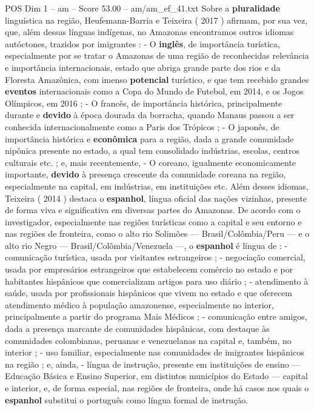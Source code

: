 \begin{textsample}{POS Dim 1 – am – Score 53.00 – am/am\_ef\_41.txt}
Sobre a \textbf{pluralidade} linguística na região, Heufemann-Barria e Teixeira ( 2017 ) afirmam, por sua vez, que, além dessas línguas indígenas, no Amazonas encontramos outros idiomas autóctones, trazidos por imigrantes : - O \textbf{inglês}, de importância turística, especialmente por se tratar o Amazonas de uma região de reconhecidas relevância e importância internacionais, estado que abriga grande parte dos rios e da Floresta Amazônica, com imenso \textbf{potencial} turístico, e que tem recebido grandes \textbf{eventos} internacionais como a Copa do Mundo de Futebol, em 2014, e os Jogos Olímpicos, em 2016 ; - O francês, de importância histórica, principalmente durante e \textbf{devido} à época dourada da borracha, quando Manaus passou a ser conhecida internacionalmente como a Paris dos Trópicos ; - O japonês, de importância histórica e \textbf{econômica} para a região, dada a grande comunidade nipônica presente no estado, a qual tem consolidado indústrias, escolas, centros culturais etc. ; e, mais recentemente, - O coreano, igualmente economicamente importante, \textbf{devido} à presença crescente da comunidade coreana na região, especialmente na capital, em indústrias, em instituições etc.
Além desses idiomas, Teixeira ( 2014 ) destaca o \textbf{espanhol}, língua oficial das nações vizinhas, presente de forma viva e significativa em diversas partes do Amazonas.
De acordo com o investigador, especialmente nas regiões turísticas como a capital e seu entorno e nas regiões de fronteira, como o alto rio Solimões — Brasil/Colômbia/Peru — e o alto rio Negro — Brasil/Colômbia/Venezuela —, o \textbf{espanhol} é língua de : - comunicação turística, usada por visitantes estrangeiros ; - negociação comercial, usada por empresários estrangeiros que estabelecem comércio no estado e por habitantes hispânicos que comercializam artigos para uso diário ; - atendimento à saúde, usada por profissionais hispânicos que vivem no estado e que oferecem atendimento médico à população amazonense, especialmente no interior, principalmente a partir do programa Mais Médicos ; - comunicação entre amigos, dada a presença marcante de comunidades hispânicas, com destaque às comunidades colombianas, peruanas e venezuelanas na capital e, também, no interior ; - uso familiar, especialmente nas comunidades de imigrantes hispânicos na região ; e, ainda, - língua de instrução, presente em instituições de ensino — Educação Básica e Ensino Superior, em distintos municípios do Estado — capital e interior, e, de forma especial, nas regiões de fronteira, onde há casos nos quais o \textbf{espanhol} substitui o português como língua formal de instrução.

\end{textsample}
